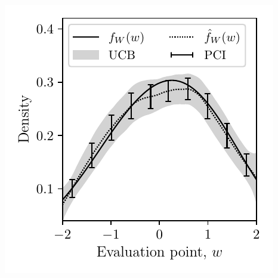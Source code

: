 \documentclass{article}
\begin{document}
\includegraphics[scale=0.5]{graphics/outcome_plot_none.pdf}
\end{document}
